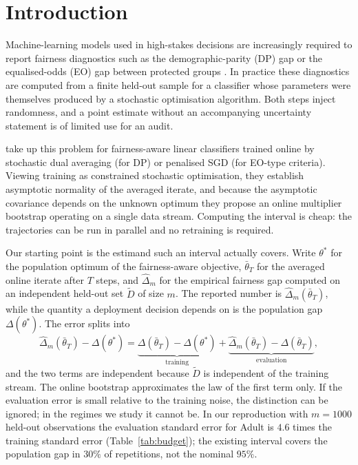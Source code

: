 \documentclass[pdflatex,sn-basic]{sn-jnl}
\newcommand{\dhat}{\hat\Delta}
\newcommand{\tbar}{\bar\theta}
\newcommand{\Dt}{\tilde D}
\begin{document}

\maketitle

\section{Introduction}
\label{sec:intro}

Machine-learning models used in high-stakes decisions are increasingly required to report fairness
diagnostics such as the demographic-parity (DP) gap or the equalised-odds (EO) gap between protected
groups \citep{hardt2016,corbett2017}.  In practice these diagnostics are computed from a finite
held-out sample for a classifier whose parameters were themselves produced by a stochastic
optimisation algorithm.  Both steps inject randomness, and a point estimate without an accompanying uncertainty statement is
of limited use for an audit.

\citet{roy2026uq} take up this problem for fairness-aware linear classifiers trained online by
stochastic dual averaging (for DP) or penalised SGD (for EO-type criteria).  Viewing training as
constrained stochastic optimisation, they establish asymptotic normality of the averaged iterate, and
because the asymptotic covariance depends on the unknown optimum they propose an online multiplier
bootstrap operating on a single data stream.  Computing the interval is cheap: the trajectories can be run in parallel and no retraining is
required.

Our starting point is the estimand such an interval actually covers.  Write
$\theta^*$ for the population optimum of the fairness-aware objective, $\tbar_T$ for the averaged
online iterate after $T$ steps, and $\dhat_m$ for the empirical fairness gap computed on an
independent held-out set $\Dt$ of size $m$.  The reported number is $\dhat_m(\tbar_T)$, while the
quantity a deployment decision depends on is the population gap $\Delta(\theta^*)$.  The error
splits into
\[
\dhat_m(\tbar_T)-\Delta(\theta^*)
=\underbrace{\Delta(\tbar_T)-\Delta(\theta^*)}_{\text{training}}
+\underbrace{\dhat_m(\tbar_T)-\Delta(\tbar_T)}_{\text{evaluation}} ,
\]
and the two terms are independent because $\Dt$ is independent of the training stream.
The online bootstrap approximates the law of the first term only.  If the evaluation error is small relative to the training noise, the distinction can be ignored; in the regimes we study it cannot be.  In our reproduction with $m=1000$ held-out observations the evaluation standard error for Adult is
$4.6$ times the training standard error (Table~\ref{tab:budget}); the existing interval covers the
population gap in $30\%$ of repetitions, not the nominal $95\%$.
\end{document}

